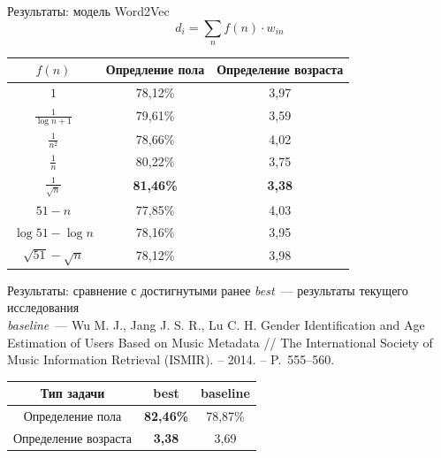 \documentclass{beamer}
\newcommand{\prevGender}{78,87\%}
\newcommand{\prevAge}{3,69}
\newcommand{\bestGender}{82,46\%}
\newcommand{\bestAge}{3,38}
\begin{document}
\begin{frame}{Результаты: модель Word2Vec}
    \[d_{i} = \sum_{n}{f(n) \cdot w_{in}}\]
    \begin{table}[h!]
    \centering
    \begin{tabular}{|c|c|c|}
    \hline
    \boldmath$f(n)$ & \textbf{Опредление пола} & \textbf{Определение возраста} \tabularnewline
    \hline
    $1$ & 78,12\% & 3,97 \tabularnewline
    \hline
    $\frac{1}{\log{n + 1}}$ & 79,61\% & 3,59 \tabularnewline
    \hline
    $\frac{1}{n^2}$ & 78,66\% & 4,02 \tabularnewline
    \hline
    $\frac{1}{n}$ & 80,22\% & 3,75 \tabularnewline
    \hline
    $\frac{1}{\sqrt{n}}$ & \textbf{81,46\%} & \textbf{3,38} \tabularnewline
    \hline
    $51 - n$ & 77,85\% & 4,03 \tabularnewline
    \hline
    $\log{51} - \log{n}$ & 78,16\% & 3,95 \tabularnewline
    \hline
    $\sqrt{51} - \sqrt{n}$ & 78,12\% & 3,98 \tabularnewline
    \hline
    \end{tabular}
    \label{tab:doc2vec_results}
    \end{table}
\end{frame}

\begin{frame}{Результаты: сравнение с достигнутыми ранее}
    \textit{best}~--- результаты текущего исследования \\
    \textit{baseline}~--- Wu M. J.,
        Jang J. S. R., Lu C. H. Gender Identification
        and Age Estimation of Users Based on Music 
        Metadata // The International Society of Music Information Retrieval (ISMIR). – 2014. – P.~555--560.
    \begin{table}[h!]
    \centering
    \begin{tabular}{|c|c|c|}
    \hline
    \textbf{Тип задачи} & \textbf{best} & \textbf{baseline} \tabularnewline
    \hline
    Определение пола & \textbf{\bestGender} & \prevGender \tabularnewline
    \hline
    Определение возраста & \textbf{\bestAge} & \prevAge \tabularnewline
    \hline
    \end{tabular}
    \label{tab:total_results}
    \end{table}
\end{frame}

\begin{frame}
    \titlepage
\end{frame}
\end{document}
